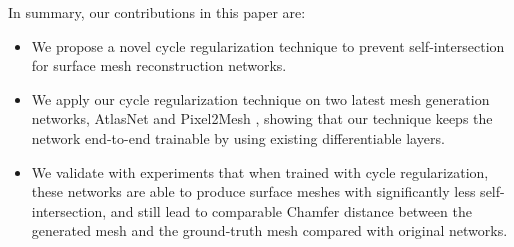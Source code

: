 In summary, our contributions in this paper are:
\begin{itemize}
	\item We propose a novel cycle regularization technique to prevent self-intersection for surface mesh reconstruction networks. 
	\item We apply our cycle regularization technique on two latest mesh generation networks, AtlasNet \cite{atlasnet} and Pixel2Mesh \cite{pixel2mesh}, showing that our technique keeps the network end-to-end trainable by using existing differentiable layers.
	\item We validate with experiments that when trained with cycle regularization, these networks are able to produce surface meshes with significantly less self-intersection, and still lead to comparable  Chamfer distance between the generated mesh and the ground-truth mesh compared with original networks. 
\end{itemize}

 